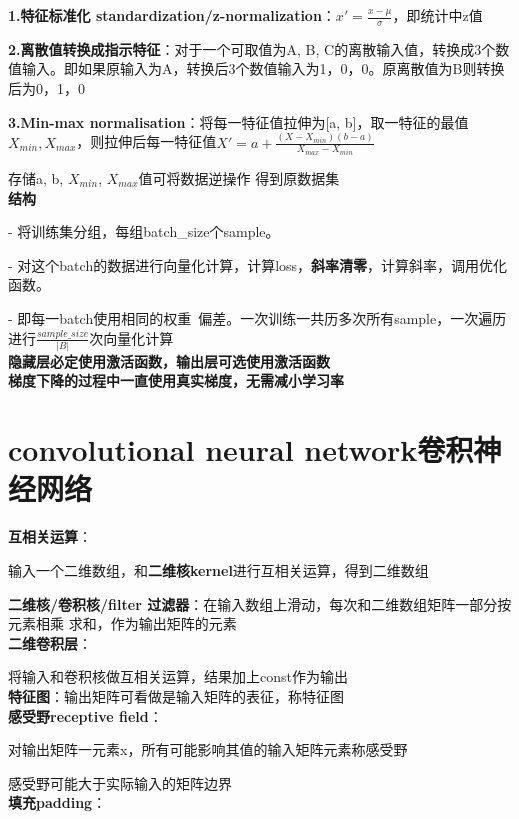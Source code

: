\documentclass[UTF8]{ctexart}
\begin{document}
  \textbf{1.特征标准化 standardization/z-normalization}：$x' = \frac{x - \mu}{\sigma}$，即统计中z值

  \textbf{2.离散值转换成指示特征}：对于一个可取值为A, B, C的离散输入值，转换成3个数值输入。即如果原输入为A，转换后3个数值输入为1，0，0。原离散值为B则转换后为0，1，0
  
  \textbf{3.Min-max normalisation}：将每一特征值拉伸为[a, b]，取一特征的最值$X_{min}, X_{max}$，则拉伸后每一特征值$X' = a + \frac{(X - X_{min})(b - a)}{X_{max} - X_{min}}$
  
  \quad 存储a, b, $X_{min}$, $X_{max}$值可将数据逆操作 得到原数据集\\
\textbf{结构}
  
  - 将训练集分组，每组batch\_size个sample。
  
  - 对这个batch的数据进行向量化计算，计算loss，\textbf{斜率清零}，计算斜率，调用优化函数。

  - 即每一batch使用相同的权重\ 偏差。一次训练一共历多次所有sample，一次遍历进行$\frac{sample\_size}{|B|}$次向量化计算\\
\textbf{隐藏层必定使用激活函数，输出层可选使用激活函数}\\
\textbf{梯度下降的过程中一直使用真实梯度，无需减小学习率}



\section{convolutional neural network卷积神经网络}
\noindent \textbf{互相关运算}：

  输入一个二维数组，和\textbf{二维核kernel}进行互相关运算，得到二维数组

  \textbf{二维核/卷积核/filter 过滤器}：在输入数组上滑动，每次和二维数组矩阵一部分按元素相乘 求和，作为输出矩阵的元素\\
\textbf{二维卷积层}：

  将输入和卷积核做互相关运算，结果加上const作为输出\\
\textbf{特征图}：输出矩阵可看做是输入矩阵的表征，称特征图\\
\textbf{感受野receptive field}：
  
  对输出矩阵一元素x，所有可能影响其值的输入矩阵元素称感受野

  感受野可能大于实际输入的矩阵边界\\
\textbf{填充padding}：
  
\end{document}
